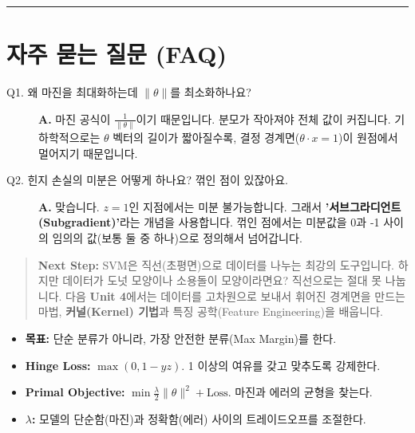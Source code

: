 \documentclass[11pt,a4paper]{book}
\theoremstyle{definition}
\begin{document}
\vspace{0.5cm}\hrule\vspace{0.5cm}

\section{자주 묻는 질문 (FAQ)}

\begin{description}
    \item[Q1. 왜 마진을 최대화하는데 $\|\theta\|$를 최소화하나요?]
    \textbf{A.} 마진 공식이 $\frac{1}{\|\theta\|}$이기 때문입니다. 분모가 작아져야 전체 값이 커집니다. 기하학적으로는 $\theta$ 벡터의 길이가 짧아질수록, 결정 경계면($\theta \cdot x = 1$)이 원점에서 멀어지기 때문입니다.
    
    \item[Q2. 힌지 손실의 미분은 어떻게 하나요? 꺾인 점이 있잖아요.]
    \textbf{A.} 맞습니다. $z=1$인 지점에서는 미분 불가능합니다. 그래서 \textbf{'서브그라디언트(Subgradient)'}라는 개념을 사용합니다. 꺾인 점에서는 미분값을 0과 -1 사이의 임의의 값(보통 둘 중 하나)으로 정의해서 넘어갑니다.
\end{description}

\vspace{1cm}
\begin{quote}
\textbf{Next Step:} SVM은 직선(초평면)으로 데이터를 나누는 최강의 도구입니다. 하지만 데이터가 도넛 모양이나 소용돌이 모양이라면요? 직선으로는 절대 못 나눕니다. 다음 \textbf{Unit 4}에서는 데이터를 고차원으로 보내서 휘어진 경계면을 만드는 마법, \textbf{커널(Kernel) 기법}과 특징 공학(Feature Engineering)을 배웁니다.
\end{quote}

\begin{summarybox}[title={Unit 3 핵심 요약}]
\begin{itemize}
    \item \textbf{목표:} 단순 분류가 아니라, 가장 안전한 분류(Max Margin)를 한다.
    \item \textbf{Hinge Loss:} $\max(0, 1-yz)$. 1 이상의 여유를 갖고 맞추도록 강제한다.
    \item \textbf{Primal Objective:} $\min \frac{\lambda}{2}\|\theta\|^2 + \text{Loss}$. 마진과 에러의 균형을 찾는다.
    \item \textbf{$\lambda$:} 모델의 단순함(마진)과 정확함(에러) 사이의 트레이드오프를 조절한다.
\end{itemize}
\end{summarybox}
\end{document}
